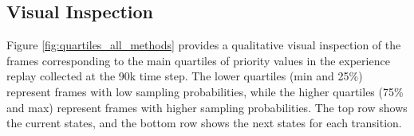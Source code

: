 \subsection{Visual Inspection}




Figure \ref{fig:quartiles_all_methods} provides a qualitative visual inspection of the frames corresponding to the main quartiles of priority values in the experience replay collected at the 90k time step. The lower quartiles (min and 25\%) represent frames with low sampling probabilities, while the higher quartiles (75\% and max) represent frames with higher sampling probabilities. The top row shows the current states, and the bottom row shows the next states for each transition.

